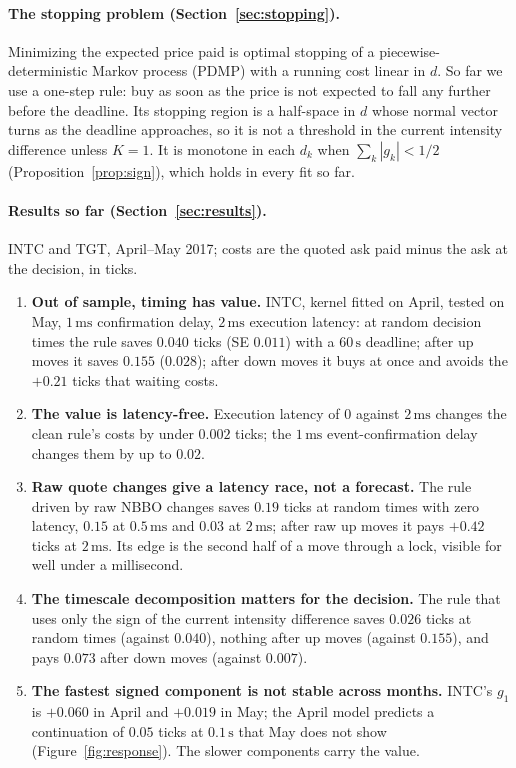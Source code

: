 \documentclass[11pt]{article}
\theoremstyle{definition}
\theoremstyle{remark}
\newcommand{\ms}{\,\text{ms}}
\newcommand{\sx}{\,\text{s}}
\begin{document}
\paragraph{The stopping problem (Section~\ref{sec:stopping}).} Minimizing the expected price paid is optimal stopping of a piecewise-deterministic Markov process (PDMP) with a running cost linear in $d$. So far we use a one-step rule: buy as soon as the price is not expected to fall any further before the deadline. Its stopping region is a half-space in $d$ whose normal vector turns as the deadline approaches, so it is not a threshold in the current intensity difference unless $K = 1$. It is monotone in each $d_k$ when $\sum_k|g_k| < 1/2$ (Proposition~\ref{prop:sign}), which holds in every fit so far.

\paragraph{Results so far (Section~\ref{sec:results}).} INTC and TGT, April--May 2017; costs are the quoted ask paid minus the ask at the decision, in ticks.
\begin{enumerate}
\item \textbf{Out of sample, timing has value.} INTC, kernel fitted on April, tested on May, $1\ms$ confirmation delay, $2\ms$ execution latency: at random decision times the rule saves $0.040$ ticks (SE $0.011$) with a $60\sx$ deadline; after up moves it saves $0.155$ ($0.028$); after down moves it buys at once and avoids the $+0.21$ ticks that waiting costs.
\item \textbf{The value is latency-free.} Execution latency of $0$ against $2\ms$ changes the clean rule's costs by under $0.002$ ticks; the $1\ms$ event-confirmation delay changes them by up to $0.02$.
\item \textbf{Raw quote changes give a latency race, not a forecast.} The rule driven by raw NBBO changes saves $0.19$ ticks at random times with zero latency, $0.15$ at $0.5\ms$ and $0.03$ at $2\ms$; after raw up moves it pays $+0.42$ ticks at $2\ms$. Its edge is the second half of a move through a lock, visible for well under a millisecond.
\item \textbf{The timescale decomposition matters for the decision.} The rule that uses only the sign of the current intensity difference saves $0.026$ ticks at random times (against $0.040$), nothing after up moves (against $0.155$), and pays $0.073$ after down moves (against $0.007$).
\item \textbf{The fastest signed component is not stable across months.} INTC's $g_1$ is $+0.060$ in April and $+0.019$ in May; the April model predicts a continuation of $0.05$ ticks at $0.1\sx$ that May does not show (Figure~\ref{fig:response}). The slower components carry the value.
\end{enumerate}
\end{document}
